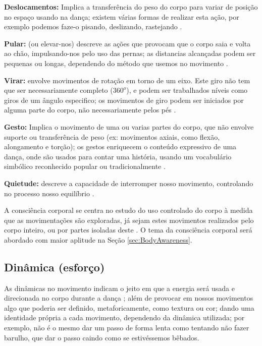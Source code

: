 \textbf{Deslocamentos:} Implica a transferência do peso do corpo 
para variar de posição no espaço usando na dança;
existem várias formas de realizar esta ação,
por exemplo podemos faze-o pisando, deslizando, rastejando \cite[pp. 28]{paine2014complete}.

\textbf{Pular:} (ou elevar-nos) descreve as ações que provocam que o corpo saia e volta ao chão,
impulsando-nos pelo uso das pernas; as distancias alcançadas podem ser pequenas ou longas,
dependendo do método que usemos no movimento  \cite[pp. 28]{paine2014complete}. 

\textbf{Virar:} envolve movimentos de rotação em torno de um eixo.
Este giro não tem que ser necessariamente completo ($360^o$),
e podem ser trabalhados níveis como giros de um ângulo especifico;
os movimentos de giro podem ser iniciados por alguma parte do corpo, 
não necessariamente pelos pés \cite[pp. 29]{paine2014complete}.

\textbf{Gesto:} Implica o movimento de uma ou varias partes do corpo,
que não envolve suporte ou transferência de peso
(ex: movimentos axiais, como flexão, alongamento e torção);
os gestos enriquecem o conteúdo expressivo de uma dança,
onde são usados para contar uma história, 
usando um vocabulário simbólico reconhecido popular ou tradicionalmente 
\cite[pp. 29]{paine2014complete}.

\textbf{Quietude:} descreve a capacidade de interromper nosso movimento, 
controlando no processo nosso equilíbrio \cite[pp. 29]{paine2014complete}.


A consciência corporal se centra no estudo do uso controlado do corpo 
à medida que as movimentações são exploradas,
já sejam estes movimentos realizados pelo corpo inteiro,
ou por partes isoladas deste \cite[pp. 5]{carline2011lesson}.
O tema da consciência corporal será abordado com maior aplitude  na Seção \ref{sec:BodyAwareness}.


\subsection{Dinâmica (esforço)}
As dinâmicas no movimento 
indicam o jeito em que a energia será usada e direcionada no corpo durante a dança \cite[pp. 131, 136]{mccutchen2006teaching};
além de provocar em nossos movimentos algo que poderia ser definido, metaforicamente, como textura ou cor;
dando uma identidade própria a cada movimento, dependendo da dinâmica utilizada;
por exemplo, não é o mesmo dar um passo de forma lenta como tentando não fazer barulho,
que dar o passo caindo como se estivéssemos bêbados.

